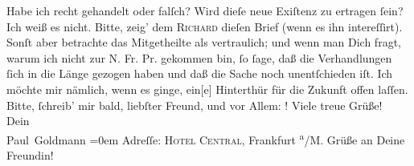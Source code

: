 \begin{ledgroupsized}[t]{13cm}
           \pstart
           Habe ich recht gehandelt oder falſch? Wird  dieſe neue Exiſtenz zu
               ertragen ſein? Ich weiß es nicht.\pend
           \pstart
           Bitte, zeig’ dem \textsc{Richard} dieſen Brief (wenn es ihn intereſſirt). Sonſt aber betrachte das Mitgetheilte
               als vertraulich; und wenn man  Dich fragt, warum ich
               nicht zur N. Fr. Pr. gekommen bin, ſo  ſage, daß die Verhandlungen
               ſich in die Länge gezogen haben und daß die Sache noch unentſchieden iſt. Ich möchte
               mir nämlich, wenn es ginge, ein{[}e{]} Hinterthür für die Zukunft
               offen laſſen.\pend
           \pstart
           Bitte, ſchreib’ mir bald, liebſter Freund, und vor Allem: \label{K_L02868-45v}\label{K_L02868-45h}!\pend
           \pstart
           Viele treue Grüße! {\\[\baselineskip]}Dein {\\[\baselineskip]}\spacefill\mbox{Paul Goldmann}\pend
           \leftskip=0em{}\pstart
           \noindent{}Adreſſe: \textsc{Hotel Central}, Frankfurt \textsuperscript{a}/M.\pend
           \pstart
           Grüße an Deine Freundin!\pend
           
         
         \endnumbering{}\end{ledgroupsized}  \newcommand{\dateiname}{L02868}\newcommand{\titel}{Paul Goldmann an Arthur Schnitzler, 5. 3. [1899]}\newcommand{\editorInnen}{Martin Anton Müller und Laura Untner}
      